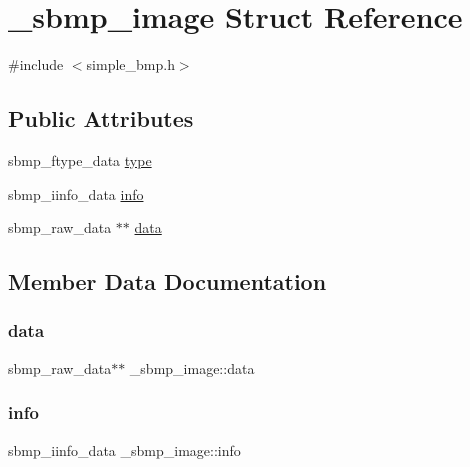 \hypertarget{struct__sbmp__image}{}\section{\+\_\+sbmp\+\_\+image Struct Reference}
\label{struct__sbmp__image}


{\ttfamily \#include $<$simple\+\_\+bmp.\+h$>$}

\subsection*{Public Attributes}
\begin{DoxyCompactItemize}
\item 
sbmp\+\_\+ftype\+\_\+data \hyperlink{struct__sbmp__image_a3ebf318f03ec1097bbde248b2d9ab769}{type}
\item 
sbmp\+\_\+iinfo\+\_\+data \hyperlink{struct__sbmp__image_a33b00b83330762d24280e6ea43913db9}{info}
\item 
sbmp\+\_\+raw\+\_\+data $\ast$$\ast$ \hyperlink{struct__sbmp__image_af0b171d8f87a831bdf290c1189300a10}{data}
\end{DoxyCompactItemize}


\subsection{Member Data Documentation}
\mbox{\label{struct__sbmp__image_af0b171d8f87a831bdf290c1189300a10}} 
\subsubsection{\texorpdfstring{data}{data}}
{\footnotesize\ttfamily sbmp\+\_\+raw\+\_\+data$\ast$$\ast$ \+\_\+sbmp\+\_\+image\+::data}

\mbox{\label{struct__sbmp__image_a33b00b83330762d24280e6ea43913db9}} 
\subsubsection{\texorpdfstring{info}{info}}
{\footnotesize\ttfamily sbmp\+\_\+iinfo\+\_\+data \+\_\+sbmp\+\_\+image\+::info}

